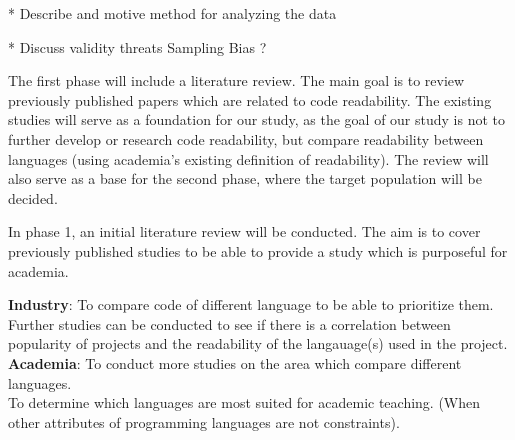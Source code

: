 \documentclass[times, 10pt,twocolumn]{IEEEtran}
\begin{document}
* Describe  and motive  method  for analyzing the data
\newline

* Discuss validity  threats
  Sampling Bias ?

The first phase will include a literature review. The main goal is to review previously published papers which are related to code readability. The existing studies will serve as a foundation for our study, as the goal of our study is not to further develop or research code readability, but compare readability between languages (using academia's existing definition of readability). The review will also serve as a base for the second phase, where the target population will be decided. 
\newline

In phase 1, an initial literature review will be conducted. The aim is to cover previously published studies to be able to provide a study which is purposeful for academia.



\textbf{Industry}: To compare code of different language to be able to prioritize them. \\
Further studies can be conducted to see if there is a correlation between popularity of projects and the readability of the langauage(s) used in the project. \\
\textbf{Academia}: To conduct more studies on the area which compare different languages. \\
To determine which languages are most suited for academic teaching. (When other attributes of programming languages are not constraints).





\end{document}
